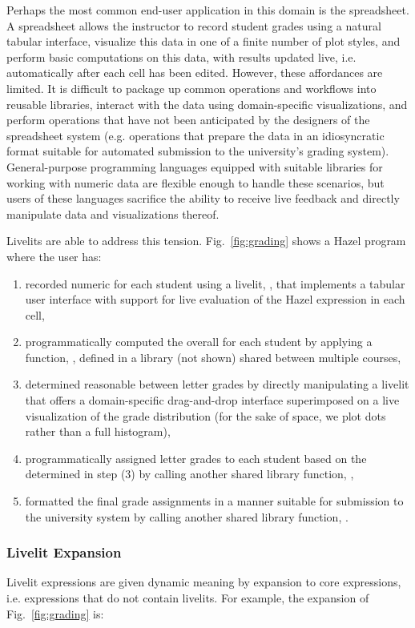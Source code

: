 Perhaps the most common end-user application in this domain is the spreadsheet.
A spreadsheet allows the instructor to record student grades using a natural tabular interface,
visualize this data in one of a finite number of plot styles, and perform basic computations on this data,
with results updated live, i.e. automatically after each cell has been edited.
However, these affordances are limited. It is difficult to package up common operations and workflows
into reusable libraries, interact with the data using domain-specific visualizations,
and perform operations that have not been anticipated by the designers of the spreadsheet system
(e.g. operations that prepare the data in an idiosyncratic format suitable for automated submission
to the university's grading system).
General-purpose programming languages equipped with suitable libraries for working with numeric data
are flexible enough to handle these scenarios, but users of these languages
sacrifice the ability to receive live feedback and directly manipulate data and visualizations thereof.

Livelits are able to address this tension.
Fig.~\ref{fig:grading} shows a Hazel program where the user has:
\begin{enumerate}
\item recorded numeric  for each student using a livelit, , that implements a tabular user interface with support for live evaluation of the Hazel expression in each cell,
\item programmatically computed the overall  for each student by applying a function, , defined in a library  (not shown) shared between multiple courses,
\item determined reasonable  between letter grades by directly manipulating a livelit that offers a domain-specific drag-and-drop interface superimposed on a live visualization of the grade distribution
(for the sake of space, we plot dots rather than a full histogram),
\item programmatically assigned letter grades to each student based on the  determined in step (3) by calling another shared library function, ,
\item formatted the final grade assignments in a manner suitable for submission to the university system by calling another shared library function, .
\end{enumerate}

\subsubsection{Livelit Expansion}\label{sec:livelit-expansion}
Livelit expressions are given dynamic meaning by expansion to core expressions, i.e. expressions that do not contain livelits.
For example, the expansion of Fig.~\ref{fig:grading} is:

